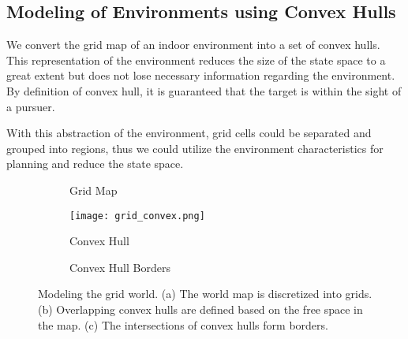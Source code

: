\documentclass[../main.tex]{subfiles}
\begin{document}
\subsection{Modeling of Environments using Convex Hulls} \label{sec:env_model}
We convert the grid map of an indoor environment into a set of convex hulls. This representation of the environment reduces the size of the state space to a great extent but does not lose necessary information regarding the environment. By definition of convex hull, it is guaranteed that the target is within the sight of a pursuer.



With this abstraction of the environment, grid cells could be separated and grouped into regions, thus we could utilize the environment characteristics for planning and reduce the state space.

\begin{figure}
    \centering
    \begin{subfigure}[b]{0.3\textwidth}
        \centering
        \caption{Grid Map}
        \label{fig:grid_map}
    \end{subfigure}
    \begin{subfigure}[b]{0.3\textwidth}
        \centering
        \texttt{[image: grid\_convex.png]}
        \caption{Convex Hull}
        \label{fig:convex_hull}
    \end{subfigure}
    \begin{subfigure}[b]{0.3\textwidth}
        \centering
        \caption{Convex Hull Borders}
        \label{fig:convex_hull_border}
    \end{subfigure}
    \caption {Modeling the grid world. (a) The world map is discretized into grids. (b) Overlapping convex hulls are defined based on the free space in the map. (c) The intersections of convex hulls form borders.} 
    \label{fig:map_discrete}
      
\end{figure}
\end{document}
